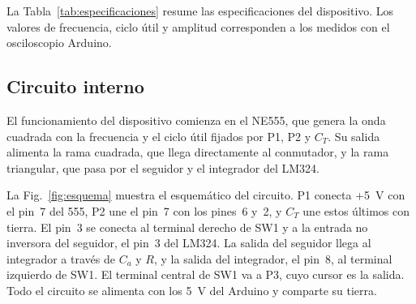 \documentclass[conference]{IEEEtran}
\begin{document}
La Tabla~\ref{tab:especificaciones} resume las especificaciones del dispositivo. Los valores de frecuencia, ciclo útil y amplitud corresponden a los medidos con el osciloscopio Arduino.

\subsection{Circuito interno}

El funcionamiento del dispositivo comienza en el NE555, que genera la onda cuadrada con la frecuencia y el ciclo útil fijados por P1, P2 y $C_T$. Su salida alimenta la rama cuadrada, que llega directamente al conmutador, y la rama triangular, que pasa por el seguidor y el integrador del LM324.

La Fig.~\ref{fig:esquema} muestra el esquemático del circuito. P1 conecta +5~V con el pin~7 del 555, P2 une el pin~7 con los pines~6 y~2, y $C_T$ une estos últimos con tierra. El pin~3 se conecta al terminal derecho de SW1 y a la entrada no inversora del seguidor, el pin~3 del LM324. La salida del seguidor llega al integrador a través de $C_a$ y $R$, y la salida del integrador, el pin~8, al terminal izquierdo de SW1. El terminal central de SW1 va a P3, cuyo cursor es la salida. Todo el circuito se alimenta con los 5~V del Arduino y comparte su tierra.
\end{document}
